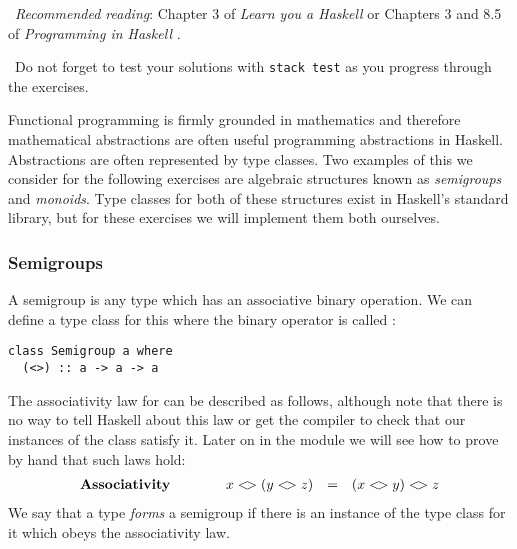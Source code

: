 \makebox[0.5cm]{\faBook}~\emph{Recommended reading}: Chapter 3 of \emph{Learn you a Haskell} \citep{lipovaca2011learn} or Chapters 3 and 8.5 of \emph{Programming in Haskell} \citep{hutton2016programming}.

\makebox[0.5cm]{\faLightbulbO}~Do not forget to test your solutions with \texttt{\small stack test} as you progress through the exercises.

\taskLine 

Functional programming is firmly grounded in mathematics and therefore mathematical abstractions are often useful programming abstractions in Haskell. Abstractions are often represented by type classes. Two examples of this we consider for the following exercises are algebraic structures known as \emph{semigroups} and \emph{monoids}. Type classes for both of these structures exist in Haskell's standard library, but for these exercises we will implement them both ourselves.

\subsubsection{Semigroups}

A semigroup is any type which has an associative binary operation. We can define a type class for this where the binary operator is called \haskellIn{<>}:
\begin{verbatim}
class Semigroup a where 
  (<>) :: a -> a -> a 
\end{verbatim}
The associativity law for \haskellIn{<>} can be described as follows, although note that there is no way to tell Haskell about this law or get the compiler to check that our instances of the  class satisfy it. Later on in the module we will see how to prove by hand that such laws hold:
\begin{displaymath}
\begin{array}{lcrcl}
\textbf{Associativity} & \qquad & x <\!> (y <\!> z) & = & (x <\!> y) <\!> z 
\end{array}
\end{displaymath}
We say that a type \emph{forms} a semigroup if there is an instance of the  type class for it which obeys the associativity law.

\taskLine



